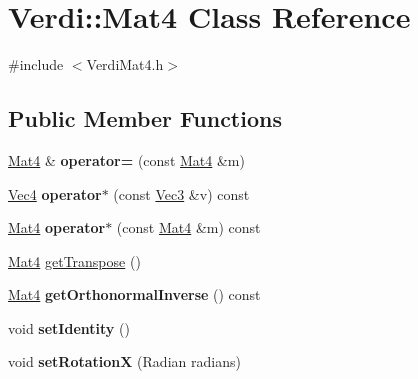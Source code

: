 \hypertarget{class_verdi_1_1_mat4}{\section{\-Verdi\-:\-:\-Mat4 \-Class \-Reference}
\label{class_verdi_1_1_mat4}
}


{\ttfamily \#include $<$\-Verdi\-Mat4.\-h$>$}

\subsection*{\-Public \-Member \-Functions}
\begin{DoxyCompactItemize}
\item 
\hypertarget{class_verdi_1_1_mat4_ae207420a1bcde2eef9ba9ffa6d4e2ff7}{\hyperlink{class_verdi_1_1_mat4}{\-Mat4} \& {\bfseries operator=} (const \hyperlink{class_verdi_1_1_mat4}{\-Mat4} \&m)}\label{class_verdi_1_1_mat4_ae207420a1bcde2eef9ba9ffa6d4e2ff7}

\item 
\hypertarget{class_verdi_1_1_mat4_ae74344fbef610331b4d1ca578b83e4f7}{\hyperlink{class_verdi_1_1_vec4}{\-Vec4} {\bfseries operator$\ast$} (const \hyperlink{class_verdi_1_1_vec3}{\-Vec3} \&v) const }\label{class_verdi_1_1_mat4_ae74344fbef610331b4d1ca578b83e4f7}

\item 
\hypertarget{class_verdi_1_1_mat4_a36fbaa0326282dcad36f276e15c7917e}{\hyperlink{class_verdi_1_1_mat4}{\-Mat4} {\bfseries operator$\ast$} (const \hyperlink{class_verdi_1_1_mat4}{\-Mat4} \&m) const }\label{class_verdi_1_1_mat4_a36fbaa0326282dcad36f276e15c7917e}

\item 
\hyperlink{class_verdi_1_1_mat4}{\-Mat4} \hyperlink{class_verdi_1_1_mat4_a5934dbad99b3ad358a1b272f5daa6722}{get\-Transpose} ()
\item 
\hypertarget{class_verdi_1_1_mat4_a5a77f04c0419a2e9708f2798e03c192f}{\hyperlink{class_verdi_1_1_mat4}{\-Mat4} {\bfseries get\-Orthonormal\-Inverse} () const }\label{class_verdi_1_1_mat4_a5a77f04c0419a2e9708f2798e03c192f}

\item 
\hypertarget{class_verdi_1_1_mat4_abb933f0693eea204a1f69c09d716e3e2}{void {\bfseries set\-Identity} ()}\label{class_verdi_1_1_mat4_abb933f0693eea204a1f69c09d716e3e2}

\item 
\hypertarget{class_verdi_1_1_mat4_ac48b85fd5b3f657756c2d7cb3141b6e8}{void {\bfseries set\-Rotation\-X} (\-Radian radians)}\label{class_verdi_1_1_mat4_ac48b85fd5b3f657756c2d7cb3141b6e8}


\end{DoxyCompactItemize}
